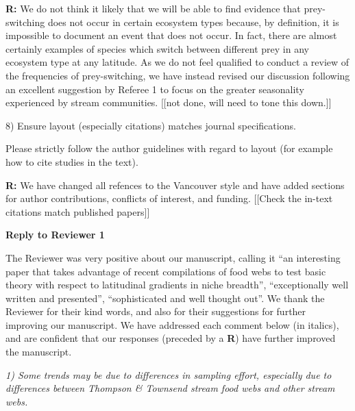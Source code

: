 \documentclass[12pt]{letter}
\newenvironment{refquote}{\bigskip \begin{it}}{\end{it}\smallskip}
\begin{document}
  \textbf{R:} We do not think it likely that we will be able to find evidence that prey-
    switching does not occur in certain ecosystem types because, by definition,
    it is impossible to document an event that does not occur. In fact, there are almost
    certainly examples of species which switch between different prey in any ecosystem type
    at any latitude. As we do not feel qualified to conduct a review of the frequencies of
    prey-switching, we have instead revised our discussion following an excellent suggestion
    by Referee 1 to focus on the greater seasonality experienced by stream communities.
    [[not done, will need to tone this down.]]

  \begin{quotation}
  \end{quotation}

  8) Ensure layout (especially citations) matches journal specifications.

  \begin{refquote}

    Please strictly follow the author guidelines with regard to layout (for
    example how to cite studies in the text).

  \end{refquote}

  \textbf{R:} We have changed all refences to the Vancouver style and have 
    added sections for author contributions, conflicts of interest, and funding.
    [[Check the in-text citations match published papers]]

  \newpage

{\Large \bf Reply to Reviewer 1}

  The Reviewer was very positive about our manuscript, calling it
  ``an interesting paper that takes advantage of recent compilations
  of food webs to test basic theory with respect to latitudinal gradients in
  niche breadth'', ``exceptionally well written and presented'', ``sophisticated
  and well thought out''. We thank the Reviewer for their kind words,
  and also for their suggestions for further improving our manuscript. We
  have addressed each comment below (in italics), and are confident that our
  responses (preceded by a \textbf{R}) have further improved the manuscript.
  

  \emph{
  1) Some trends may be due to differences in sampling effort, especially
  due to differences between Thompson \& Townsend stream food webs and other
  stream webs.}
\end{document}

